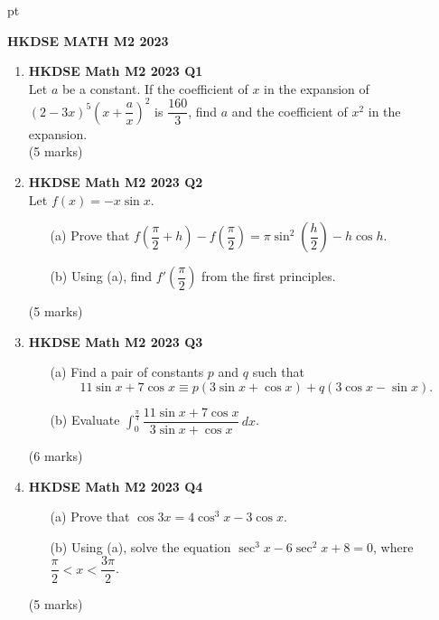 \documentclass[12pt]{article}
\begin{document}
 pt
\begin{center}
	{\large \bf HKDSE MATH M2 2023}\\
	\vspace{2 mm}

\end{center}
\vspace{0.05cm}

\begin{enumerate}
	\item \textbf{HKDSE Math M2 2023 Q1}\\
	Let $a$ be a constant. If the coefficient of $x$ in the expansion of $(2-3x)^5\left(x + \dfrac{a}{x}\right)^2$ is $\dfrac{160}{3}$, find $a$ and the coefficient of $x^2$ in the expansion.\\
	(5 marks)

	\item \textbf{HKDSE Math M2 2023 Q2}\\
	Let $f(x) = -x \sin{x}$.
	\begin{enumerate}
		\item [(a)]Prove that $f\left(\dfrac{\pi}{2} + h\right) - f\left(\dfrac{\pi}{2}\right) = \pi \sin^2{\left(\dfrac{h}{2}\right)} - h \cos{h}$.
		\item [(b)]Using (a), find $f'\left(\dfrac{\pi}{2}\right)$ from the first principles.
	\end{enumerate}
	(5 marks)

	\item \textbf{HKDSE Math M2 2023 Q3}
	\begin{enumerate}
		\item [(a)]Find a pair of constants $p$ and $q$ such that $$11\sin{x} + 7\cos{x} \equiv p(3\sin{x} + \cos{x}) + q(3\cos{x} - \sin{x}).$$
		\item [(b)]Evaluate $\displaystyle \int^{\frac{\pi}{4}}_{0} \dfrac{11\sin{x} + 7\cos{x}}{3\sin{x} + \cos{x}} \,dx$.
	\end{enumerate}
	(6 marks)


	\item \textbf{HKDSE Math M2 2023 Q4}
	\begin{enumerate}
		\item[(a)]Prove that $\cos{3x} = 4\cos^3{x} - 3\cos{x}$.
		\item[(b)]Using (a), solve the equation $\sec^3{x} - 6\sec^2{x} + 8 = 0$, where $\dfrac{\pi}{2} < x < \dfrac{3\pi}{2}$.
	\end{enumerate}
	(5 marks)


\end{enumerate}
\end{document}
